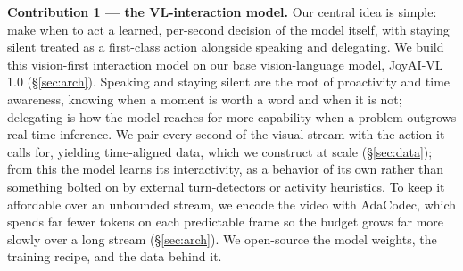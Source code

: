 
\textbf{Contribution 1 — the VL-interaction model.} Our central idea is simple: make when to act a learned, per-second decision of the model itself, with staying silent treated as a first-class action alongside speaking and delegating. We build this vision-first interaction model on our base vision-language model, JoyAI-VL 1.0 (\S\ref{sec:arch}). Speaking and staying silent are the root of proactivity and time awareness, knowing when a moment is worth a word and when it is not; delegating is how the model reaches for more capability when a problem outgrows real-time inference. We pair every second of the visual stream with the action it calls for, yielding time-aligned data, which we construct at scale (\S\ref{sec:data}); from this the model learns its interactivity, as a behavior of its own rather than something bolted on by external turn-detectors or activity heuristics. To keep it affordable over an unbounded stream, we encode the video with AdaCodec\cite{hou2026adacodecpredictivevisualcode}, which spends far fewer tokens on each predictable frame so the budget grows far more slowly over a long stream (\S\ref{sec:arch}). We open-source the model weights, the training recipe, and the data behind it.

